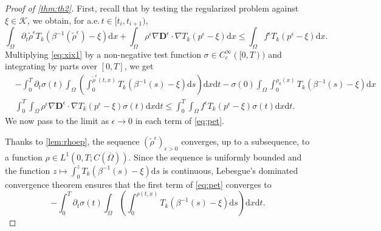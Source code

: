 \documentclass[final,reqno]{amsart}
\theoremstyle{plain}
\theoremstyle{definition}
\theoremstyle{remark}
\numberwithin{remark}{section}	%
\numberwithin{example}{section}	%
\newcommand{\de}{\mathbf{D}}
\newcommand{\K}{\mathcal K}
\newcommand{\Om}{\Omega}
\newcommand{\pp}{a.e.\,}
\newcommand{\dd}{\mathrm{d}}
\begin{document}
\begin{proof}[Proof of \cref{thm:th2}]
    First, recall that by testing the regularized problem against $\xi \in \K$, we obtain, for \pp $t \in [t_i, t_{i+1})$,
    \begin{equation}\label{eq:xix1}
        \int_{\Omega} \partial_t \tilde{\rho}^{\epsilon} T_k(\beta^{-1}(\tilde{\rho}^{\epsilon})-\xi) \dd x + \int_{\Omega} \rho^{\epsilon} \nabla \de^{\epsilon} \cdot \nabla T_k(p^{\epsilon}-\xi) \dd x \le \int_{\Omega} f^{\epsilon} T_k(p^{\epsilon}-\xi) \dd x.
    \end{equation}
    Multiplying \eqref{eq:xix1} by a non-negative test function $\sigma \in C^{\infty}_{c}([0,T))$ and integrating by parts over $[0,T]$, we get
    \begin{equation}\label{eq:pet}
        \begin{aligned}
        &-\int_{0}^{T}\partial_t \sigma(t) \int_{\Omega} \left(\int_{0}^{\tilde{\rho}^{\epsilon}(t,x)}T_k(\beta^{-1}(s)-\xi) \dd s \right) \dd x \dd t  - \sigma(0) \int_{\Om}\int_{0}^{{\rho}_0(x)} T_{k}(\beta^{-1}(s) -\xi)\dd x\\
        & \int_{0}^{T}\int_{\Omega} \rho^{\epsilon} \nabla \de^{\epsilon} \cdot \nabla T_k(p^{\epsilon}-\xi)\sigma(t) \dd x \dd t \leq \int_{0}^{T} \int_{\Omega} f^{\epsilon} T_k(p^{\epsilon}-\xi) \sigma(t) \dd x \dd t.
        \end{aligned}
    \end{equation}
    We now pass to the limit as $\epsilon \to 0$ in each term of \eqref{eq:pet}. 
    
    Thanks to \cref{lem:rhoep}, the sequence $(\tilde{\rho}^{\epsilon})_{\epsilon>0}$ converges, up to a subsequence, to a function $\rho \in L^1(0,T; C(\overline{\Omega}))$. Since the sequence is uniformly bounded and the function $z \mapsto \int_0^z T_k(\beta^{-1}(s)-\xi) \dd s$ is continuous, Lebesgue's dominated convergence theorem ensures that the first term of \eqref{eq:pet} converges to 
    \[
        -\int_{0}^{T}\partial_t \sigma(t) \int_{\Omega} \left(\int_{0}^{\rho(t,x)} T_k(\beta^{-1}(s)-\xi) \dd s \right) \dd x \dd t.
    \]
   

\end{proof}
\end{document}
